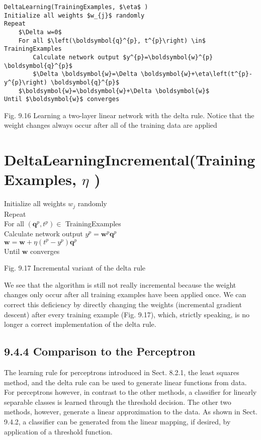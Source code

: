 \documentclass[10pt]{article}
\begin{document}
\begin{verbatim}
DeltaLearning(TrainingExamples, $\eta$ )
Initialize all weights $w_{j}$ randomly
Repeat
    $\Delta w=0$
    For all $\left(\boldsymbol{q}^{p}, t^{p}\right) \in$ TrainingExamples
        Calculate network output $y^{p}=\boldsymbol{w}^{p} \boldsymbol{q}^{p}$
        $\Delta \boldsymbol{w}=\Delta \boldsymbol{w}+\eta\left(t^{p}-y^{p}\right) \boldsymbol{q}^{p}$
    $\boldsymbol{w}=\boldsymbol{w}+\Delta \boldsymbol{w}$
Until $\boldsymbol{w}$ converges
\end{verbatim}

Fig. 9.16 Learning a two-layer linear network with the delta rule. Notice that the weight changes always occur after all of the training data are applied

\section*{DeltaLearningIncremental(TrainingExamples, $\eta$ )}
Initialize all weights $w_{j}$ randomly\\
Repeat\\
For all $\left(\boldsymbol{q}^{p}, t^{p}\right) \in$ TrainingExamples\\
Calculate network output $y^{p}=\boldsymbol{w}^{p} \boldsymbol{q}^{p}$\\
$\boldsymbol{w}=\boldsymbol{w}+\eta\left(t^{p}-y^{p}\right) \boldsymbol{q}^{p}$\\
Until $\boldsymbol{w}$ converges

Fig. 9.17 Incremental variant of the delta rule

We see that the algorithm is still not really incremental because the weight changes only occur after all training examples have been applied once. We can correct this deficiency by directly changing the weights (incremental gradient descent) after every training example (Fig. 9.17), which, strictly speaking, is no longer a correct implementation of the delta rule.

\subsection*{9.4.4 Comparison to the Perceptron}
The learning rule for perceptrons introduced in Sect. 8.2.1, the least squares method, and the delta rule can be used to generate linear functions from data. For perceptrons however, in contrast to the other methods, a classifier for linearly separable classes is learned through the threshold decision. The other two methods, however, generate a linear approximation to the data. As shown in Sect. 9.4.2, a classifier can be generated from the linear mapping, if desired, by application of a threshold function.
\end{document}
